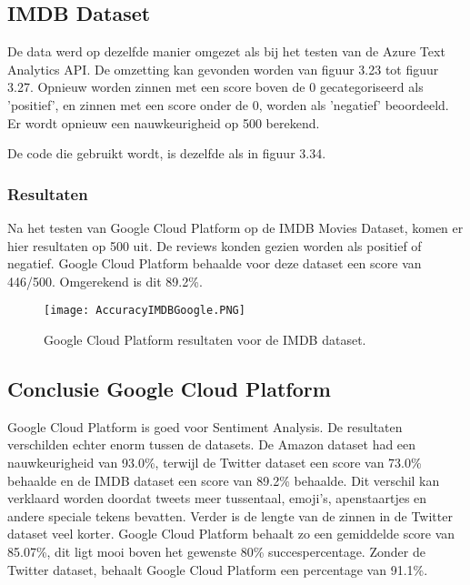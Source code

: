 \subsection{IMDB Dataset}
\label{imdbgoogleplatform}
De data werd op dezelfde manier omgezet als bij het testen van de Azure Text Analytics API. De omzetting kan gevonden worden van figuur 3.23 tot figuur 3.27. Opnieuw worden zinnen met een score boven de 0 gecategoriseerd als 'positief', en zinnen met een score onder de 0, worden als 'negatief' beoordeeld. Er wordt opnieuw een nauwkeurigheid op 500 berekend.

De code die gebruikt wordt, is dezelfde als in figuur 3.34.


\subsubsection{Resultaten}
\label{imdbresultatengoogleplatform}
Na het testen van Google Cloud Platform op de IMDB Movies Dataset, komen er hier resultaten op 500 uit. De reviews konden gezien worden als positief of negatief. Google Cloud Platform behaalde voor deze dataset een score van 446/500. Omgerekend is dit 89.2\%.

\begin{figure}[!htbp]
    \texttt{[image: AccuracyIMDBGoogle.PNG]}
    \caption{\label{accuracyimdb}Google Cloud Platform resultaten voor de IMDB dataset.}
\end{figure}
\FloatBarrier 
\subsection{Conclusie Google Cloud Platform}
\label{conclusieGoogleCloudPlatform}

Google Cloud Platform is goed voor Sentiment Analysis. De resultaten verschilden echter enorm tussen de datasets. De Amazon dataset had een nauwkeurigheid van 93.0\%, terwijl de Twitter dataset een score van 73.0\% behaalde en de IMDB dataset een score van 89.2\% behaalde. Dit verschil kan verklaard worden doordat tweets meer tussentaal, emoji's, apenstaartjes en andere speciale tekens bevatten. Verder is de lengte van de zinnen in de Twitter dataset veel korter. Google Cloud Platform behaalt zo een gemiddelde score van 85.07\%, dit ligt mooi boven het gewenste 80\% succespercentage. Zonder de Twitter dataset, behaalt Google Cloud Platform een percentage van 91.1\%.


